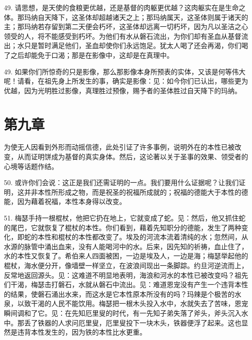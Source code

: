 49. 请思想，是天使的食粮更优越，还是基督的肉躯更优越？这肉躯实在是生命之体。那玛纳自天降下，这圣体却超越诸天之上；那玛纳属天，这圣体则属于诸天的主；那玛纳若存留到第二天便会朽坏，这圣体却远离一切朽坏，因为凡以圣洁之心领受的人，将不能感受到朽坏。为他们有水从磐石流出，为你们却有圣血从基督流出；水只是暂时满足他们，圣血却使你们永远饱足。犹太人喝了还会再渴，你们喝了之后却能免于口渴；那是在影像中，这却是在真理中。\par

49. 如果你们所惊奇的只是影像，那么那影像本身所预表的实体，又该是何等伟大呢！请看，在祖先身上所发生的事，确实是影像：见：如今你们已认出，哪些更为优越，因为光明胜过影像，真理胜过预像，赐予者的圣体胜过自天降下的玛纳。\par


\section{第九章}

为使无人因看到外形而动摇信德，此处引证了许多事例，说明外在的本性已被改变，从而证明饼成为基督的真实身体。然后，这论著以关于圣事的效果、领受者的心境等话题作结。\par

50. 或许你们会说：这正是我们还需证明的一点。我们要用什么证据呢？让我们证明，这并非本性所形成之物，而是祝圣的祝福所成就的；祝福的德能大于本性的德能，因为藉着祝福，本性本身得以改变。\par

51. 梅瑟手持一根棍杖，他把它扔在地上，它就变成了蛇。见：然后，他又抓住蛇的尾巴，它就恢复了棍杖的本性。你们看到，藉着先知职分的德能，发生了两种变化，即蛇的本性和棍杖的本性都改变了。埃及的河流本流着清纯的水；忽然间，从水源的脉管中涌出血来，没有人能喝河中的水。后来，因先知的祈祷，血止住了，水的本性又恢复了。希伯来人四面被困，一边是埃及人，一边是海；梅瑟举起他的棍杖，海水便分开，像墙壁一样坚立，在波浪间现出一条脚踪。约旦河逆流而上，反常地返回源头。见：这难道不明显地表明，海浪和河水的本性已被改变吗？祖先们干渴，梅瑟击打磐石，水就从磐石中流出。见：难道恩宠没有产生一个违背本性的结果，使磐石涌出水来，而这水是它本性原本所没有的吗？玛辣是个极苦的水泉，以致干渴的人民不能饮用。梅瑟把一根木头投入水中，水就失去了苦味，恩宠瞬间调和了它。见：在先知厄里叟的时代，有一先知子弟失落了斧头，斧头沉入水中。那丢了铁器的人求问厄里叟，厄里叟投下一块木头，铁器便浮了起来。这也显然是违背本性发生的，因为铁的本性比水更重。\par

